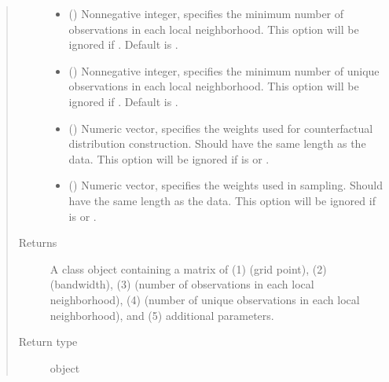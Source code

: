 \documentclass[letterpaper,10pt,english]{sphinxmanual}
\begin{document}
\begin{fulllineitems}
\begin{quote}
\begin{description}
\begin{itemize}
\item {} 
\sphinxAtStartPar
{} () \textendash{} Nonnegative integer, specifies the minimum number of observations in each local neighborhood. This option
will be ignored if . Default is .

\item {} 
\sphinxAtStartPar
{} () \textendash{} Nonnegative integer, specifies the minimum number of unique observations in each local neighborhood. This option
will be ignored if . Default is .

\item {} 
\sphinxAtStartPar
{} () \textendash{} Numeric vector, specifies the weights used
for counterfactual distribution construction. Should have the same length as the data.
This option will be ignored if  is  or .

\item {} 
\sphinxAtStartPar
{} () \textendash{} Numeric vector, specifies the weights used
in sampling. Should have the same length as the data.
This option will be ignored if  is  or .

\end{itemize}

\item[{Returns}] \leavevmode
\sphinxAtStartPar
{} \textendash{} A {\hyperref[\detokenize{lpbwdensity:lpdensity.lpbwdensity.bw_output}]{}} class object containing a matrix of (1)  (grid point), (2)  (bandwidth),
(3)  (number of observations in each local neighborhood),
(4)  (number of unique observations in each local neighborhood), and
(5)  additional parameters.

\item[{Return type}] \leavevmode
\sphinxAtStartPar
object

\end{description}\end{quote}

\end{fulllineitems}
\end{document}
